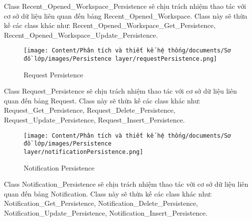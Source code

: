 \par
Class Recent\_Opened\_Workspace\_Persistence sẽ chịu trách nhiệm thao tác với cơ sở dữ liệu
liên quan đến bảng Recent\_Opened\_Workspace. Class này sẽ thừa kế các class khác như:
Recent\_Opened\_Workspace\_Get\_Persistence, Recent\_Opened\_Workspace\_Update\_Persistence.
\begin{figure}[H]
    \centering
    \texttt{[image: Content/Phân tích và thiết kế hệ thống/documents/Sơ đồ lớp/images/Persistence layer/requestPersistence.png]}
    \vspace{0.5cm}
    \caption{Request Persistence}
    \label{fig:Request Persistence}
\end{figure}
\par
Class Request\_Persistence sẽ chịu trách nhiệm thao tác với cơ sở dữ liệu
liên quan đến bảng Request. Class này sẽ thừa kế các class khác như:
Request\_Get\_Persistence, Request\_Delete\_Persistence, Request\_Update\_Persistence, Request\_Insert\_Persistence.
\begin{figure}[H]
    \centering
    \texttt{[image: Content/Phân tích và thiết kế hệ thống/documents/Sơ đồ lớp/images/Persistence layer/notificationPersistence.png]}
    \vspace{0.5cm}
    \caption{Notification Persistence}
    \label{fig:Notification Persistence}
\end{figure}
\par
Class Notification\_Persistence sẽ chịu trách nhiệm thao tác với cơ sở dữ liệu
liên quan đến bảng Notification. Class này sẽ thừa kế các class khác như:
Notification\_Get\_Persistence, Notification\_Delete\_Persistence, Notification\_Update\_Persistence, Notification\_Insert\_Persistence.